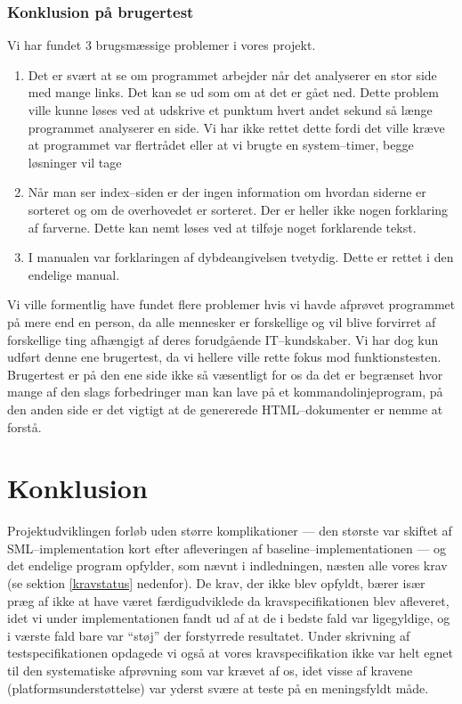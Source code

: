 \documentclass[a4paper,oneside]{memoir}
\begin{document}
\subsection{Konklusion på brugertest}
Vi har fundet 3 brugsmæssige problemer i vores projekt.
\begin{enumerate}
\item Det er svært at se om programmet arbejder når det analyserer en
  stor side med mange links. Det kan se ud som om at det er gået
  ned. Dette problem ville kunne løses ved at udskrive et punktum
  hvert andet sekund så længe programmet analyserer en side. Vi har
  ikke rettet dette fordi det ville kræve at programmet var flertrådet
  eller at vi brugte en system--timer, begge løsninger vil tage
\item Når man ser index--siden er der ingen information om hvordan
  siderne er sorteret og om de overhovedet er sorteret. Der er heller
  ikke nogen forklaring af farverne. Dette kan nemt løses ved at
  tilføje noget forklarende tekst.
\item I manualen var forklaringen af dybdeangivelsen tvetydig. Dette
  er rettet i den endelige manual.
\end{enumerate}

Vi ville formentlig have fundet flere problemer hvis vi havde afprøvet
programmet på mere end en person, da alle mennesker er forskellige og
vil blive forvirret af forskellige ting afhængigt af deres forudgående
IT--kundskaber. Vi har dog kun udført denne ene brugertest, da vi
hellere ville rette fokus mod funktionstesten. Brugertest er på den
ene side ikke så væsentligt for os da det er begrænset hvor mange af
den slags forbedringer man kan lave på et kommandolinjeprogram, på den
anden side er det vigtigt at de genererede HTML--dokumenter er nemme
at forstå. 

\chapter{Konklusion}
\label{konklusion}

Projektudviklingen forløb uden større komplikationer --- den største
var skiftet af SML--implementation kort efter afleveringen af
baseline--implementationen --- og det endelige program opfylder, som
nævnt i indledningen, næsten alle vores krav (se sektion
\ref{kravstatus} nedenfor). De krav, der ikke blev opfyldt, bærer især
præg af ikke at have været færdigudviklede da kravspecifikationen blev
afleveret, idet vi under implementationen fandt ud af at de i bedste
fald var ligegyldige, og i værste fald bare var ``støj'' der
forstyrrede resultatet. Under skrivning af testspecifikationen
opdagede vi også at vores kravspecifikation ikke var helt egnet til
den systematiske afprøvning som var krævet af os, idet visse af
kravene (platformsunderstøttelse) var yderst svære at teste på en
meningsfyldt måde.
\end{document}
